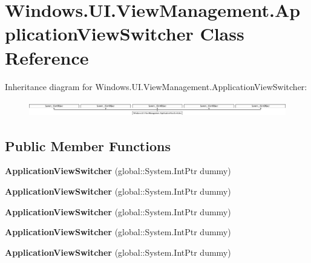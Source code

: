 \hypertarget{class_windows_1_1_u_i_1_1_view_management_1_1_application_view_switcher}{}\section{Windows.\+U\+I.\+View\+Management.\+Application\+View\+Switcher Class Reference}
\label{class_windows_1_1_u_i_1_1_view_management_1_1_application_view_switcher}
Inheritance diagram for Windows.\+U\+I.\+View\+Management.\+Application\+View\+Switcher\+:\begin{figure}[H]
\begin{center}
\leavevmode
\includegraphics[height=0.672673cm]{class_windows_1_1_u_i_1_1_view_management_1_1_application_view_switcher}
\end{center}
\end{figure}
\subsection*{Public Member Functions}
\begin{DoxyCompactItemize}
\item 
\mbox{\label{class_windows_1_1_u_i_1_1_view_management_1_1_application_view_switcher_a2817e5d23f7609d8d1e523d7bd116991}} 
{\bfseries Application\+View\+Switcher} (global\+::\+System.\+Int\+Ptr dummy)
\item 
\mbox{\label{class_windows_1_1_u_i_1_1_view_management_1_1_application_view_switcher_a2817e5d23f7609d8d1e523d7bd116991}} 
{\bfseries Application\+View\+Switcher} (global\+::\+System.\+Int\+Ptr dummy)
\item 
\mbox{\label{class_windows_1_1_u_i_1_1_view_management_1_1_application_view_switcher_a2817e5d23f7609d8d1e523d7bd116991}} 
{\bfseries Application\+View\+Switcher} (global\+::\+System.\+Int\+Ptr dummy)
\item 
\mbox{\label{class_windows_1_1_u_i_1_1_view_management_1_1_application_view_switcher_a2817e5d23f7609d8d1e523d7bd116991}} 
{\bfseries Application\+View\+Switcher} (global\+::\+System.\+Int\+Ptr dummy)
\item 
\mbox{\label{class_windows_1_1_u_i_1_1_view_management_1_1_application_view_switcher_a2817e5d23f7609d8d1e523d7bd116991}} 
{\bfseries Application\+View\+Switcher} (global\+::\+System.\+Int\+Ptr dummy)
\end{DoxyCompactItemize}
